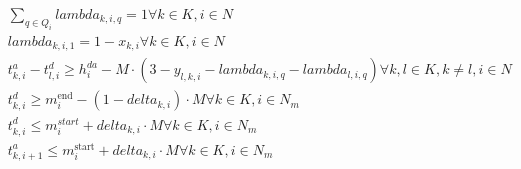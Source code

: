 \begin{align}
  & \sum_{q \in Q_{i}} \mathit{lambda}_{k , i , q} = 1 \forall k \in K , i \in N \tag{eq\_0036} \\
  & \mathit{lambda}_{k , i , 1} = 1 - x_{k , i} \forall k \in K , i \in N \tag{eq\_0037} \\
  & t_{k , i}^{a} - t_{l , i}^{d} \geq h_{i}^{d a} - M \cdot \left(3 - y_{l , k , i} - \mathit{lambda}_{k , i , q} - \mathit{lambda}_{l , i , q}\right) \forall k , l \in K , k \neq l , i \in N \tag{eq\_0038} \\
  & t_{k , i}^{d} \geq m_{i}^{\text{end}} - \left(1 - \mathit{delta}_{k , i}\right) \cdot M \forall k \in K , i \in N_{m} \tag{eq\_0039} \\
  & t_{k , i}^{d} \leq m_{i}^{start} + \mathit{delta}_{k , i} \cdot M \forall k \in K , i \in N_{m} \tag{eq\_0040} \\
  & t_{k , i + 1}^{a} \leq m_{i}^{\text{start}} + \mathit{delta}_{k , i} \cdot M \forall k \in K , i \in N_{m} \tag{eq\_0041} \\
\end{align}
